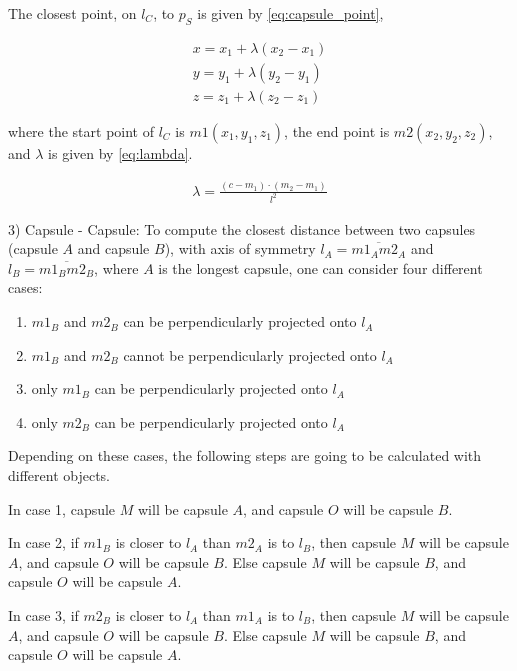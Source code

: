 \documentclass[a4paper, 10pt, conference]{ieeeconf}      %
\begin{document}
The closest point, on $l_C$, to $p_S$ is given by \eqref{eq:capsule_point},

\begin{equation}       
    \begin{matrix} 
        x = x_1 + \lambda(x_2 - x_1) \\
        y = y_1 + \lambda(y_2 - y_1) \\
        z = z_1 + \lambda(z_2 - z_1) \label{eq:capsule_point}
    \end{matrix}
\end{equation}

where the start point of $l_C$ is $m1(x_1, y_1, z_1)$, the end point is $m2(x_2, y_2, z_2)$, and $\lambda$ is given by \eqref{eq:lambda}.

\begin{equation}       
    \begin{matrix} 
        \lambda = \frac{(c - m_1) \cdot (m_2 - m_1 )}{l^2} \label{eq:lambda}
    \end{matrix}
\end{equation}

3) Capsule - Capsule:
To compute the closest distance between two capsules (capsule $A$ and capsule $B$), with axis of symmetry $l_A = \overline{m1_A m2_A}$ and $l_B = \overline{m1_B m2_B}$, 
where $A$ is the longest capsule, one can consider four different cases:
\begin{enumerate}
    \item $m1_B$ and $m2_B$ can be perpendicularly projected onto $l_A$
    \item $m1_B$ and $m2_B$ cannot be perpendicularly projected onto $l_A$
    \item only $m1_B$ can be perpendicularly projected onto $l_A$
    \item only $m2_B$ can be perpendicularly projected onto $l_A$
\end{enumerate} 

Depending on these cases, the following steps are going to be calculated with different objects.

In case 1, capsule $M$ will be capsule $A$, and capsule $O$ will be capsule $B$.

In case 2, if $m1_B$ is closer to $l_A$ than $m2_A$ is to $l_B$, then capsule $M$ will be capsule $A$, and capsule $O$ will be capsule $B$.
Else capsule $M$ will be capsule $B$, and capsule $O$ will be capsule $A$.

In case 3, if $m2_B$ is closer to $l_A$ than $m1_A$ is to $l_B$, then capsule $M$ will be capsule $A$, and capsule $O$ will be capsule $B$.
Else capsule $M$ will be capsule $B$, and capsule $O$ will be capsule $A$.
\end{document}
